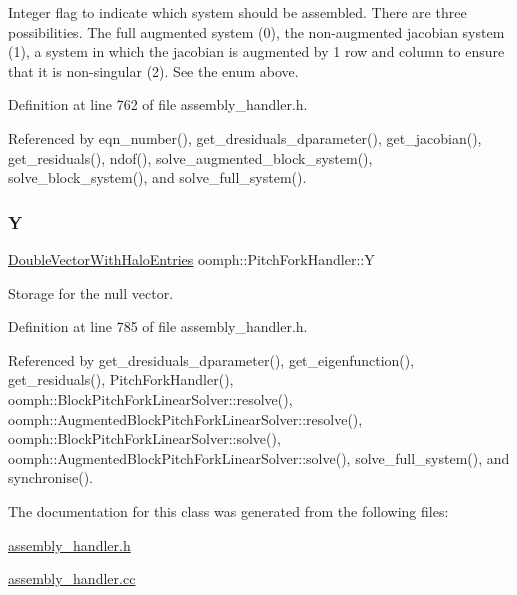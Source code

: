 Integer flag to indicate which system should be assembled. There are three possibilities. The full augmented system (0), the non-\/augmented jacobian system (1), a system in which the jacobian is augmented by 1 row and column to ensure that it is non-\/singular (2). See the enum above. 



Definition at line 762 of file assembly\+\_\+handler.\+h.



Referenced by eqn\+\_\+number(), get\+\_\+dresiduals\+\_\+dparameter(), get\+\_\+jacobian(), get\+\_\+residuals(), ndof(), solve\+\_\+augmented\+\_\+block\+\_\+system(), solve\+\_\+block\+\_\+system(), and solve\+\_\+full\+\_\+system().

\mbox{\label{classoomph_1_1PitchForkHandler_a289ce15584734b8ea50cd9a7f7f430ed}} 
\subsubsection{\texorpdfstring{Y}{Y}}
{\footnotesize\ttfamily \hyperlink{classoomph_1_1DoubleVectorWithHaloEntries}{Double\+Vector\+With\+Halo\+Entries} oomph\+::\+Pitch\+Fork\+Handler\+::Y\hspace{0.3cm}{\ttfamily [private]}}



Storage for the null vector. 



Definition at line 785 of file assembly\+\_\+handler.\+h.



Referenced by get\+\_\+dresiduals\+\_\+dparameter(), get\+\_\+eigenfunction(), get\+\_\+residuals(), Pitch\+Fork\+Handler(), oomph\+::\+Block\+Pitch\+Fork\+Linear\+Solver\+::resolve(), oomph\+::\+Augmented\+Block\+Pitch\+Fork\+Linear\+Solver\+::resolve(), oomph\+::\+Block\+Pitch\+Fork\+Linear\+Solver\+::solve(), oomph\+::\+Augmented\+Block\+Pitch\+Fork\+Linear\+Solver\+::solve(), solve\+\_\+full\+\_\+system(), and synchronise().



The documentation for this class was generated from the following files\+:\begin{DoxyCompactItemize}
\item 
\hyperlink{assembly__handler_8h}{assembly\+\_\+handler.\+h}\item 
\hyperlink{assembly__handler_8cc}{assembly\+\_\+handler.\+cc}\end{DoxyCompactItemize}
